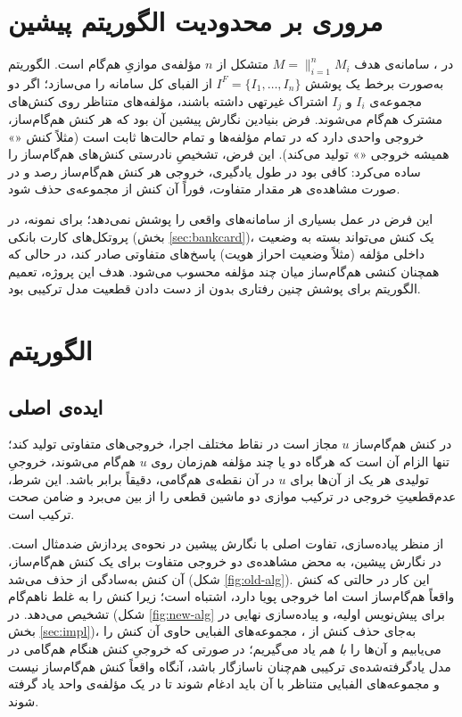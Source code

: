 \documentclass[a4paper,12pt]{article}
\numberwithin{algorithm}{section}
\begin{document}
\section{مروری بر محدودیت الگوریتم پیشین}
در ، سامانه‌ی هدف $M=\parallel_{i=1}^{n}M_i$ متشکل از $n$ مؤلفه‌ی موازیِ هم‌گام است. الگوریتم به‌صورت برخط یک پوشش $I^F=\{I_1,\dots,I_n\}$ از الفبای کل سامانه را می‌سازد؛ اگر دو مجموعه‌ی $I_i$ و $I_j$ اشتراک غیرتهی داشته باشند، مؤلفه‌های متناظر روی کنش‌های مشترک هم‌گام می‌شوند. فرض بنیادین نگارش پیشین آن بود که هر کنش هم‌گام‌ساز، خروجی واحدی دارد که در تمام مؤلفه‌ها و تمام حالت‌ها ثابت است (مثلاً کنش «» همیشه خروجی «» تولید می‌کند). این فرض، تشخیصِ نادرستی کنش‌های هم‌گام‌ساز را ساده می‌کرد: کافی بود در طول یادگیری، خروجی هر کنش هم‌گام‌ساز رصد و در صورت مشاهده‌ی هر مقدار متفاوت، فوراً آن کنش از مجموعه‌ی  حذف شود.

این فرض در عمل بسیاری از سامانه‌های واقعی را پوشش نمی‌دهد؛ برای نمونه، در پروتکل‌های کارت بانکی (بخش \ref{sec:bankcard})، یک کنش می‌تواند بسته به وضعیت داخلی مؤلفه (مثلاً وضعیت احراز هویت) پاسخ‌های متفاوتی صادر کند، در حالی که همچنان کنشی هم‌گام‌ساز میان چند مؤلفه محسوب می‌شود. هدف این پروژه، تعمیم الگوریتم برای پوشش چنین رفتاری بدون از دست دادن قطعیت مدل ترکیبی بود.

\section{الگوریتم }\label{sec:escl}

\subsection{ایده‌ی اصلی}
در  کنش هم‌گام‌ساز $u$ مجاز است در نقاط مختلف اجرا، خروجی‌های متفاوتی تولید کند؛ تنها الزام آن است که هرگاه دو یا چند مؤلفه هم‌زمان روی $u$ هم‌گام می‌شوند، خروجیِ تولیدی هر یک از آن‌ها برای $u$ در آن نقطه‌ی هم‌گامی، دقیقاً برابر باشد. این شرط، عدم‌قطعیتِ خروجی در ترکیب موازی دو ماشین  قطعی را از بین می‌برد و ضامن صحت ترکیب است.

از منظر پیاده‌سازی، تفاوت اصلی با نگارش پیشین در نحوه‌ی پردازش ضدمثال است. در نگارش پیشین، به محض مشاهده‌ی دو خروجی متفاوت برای یک کنش هم‌گام‌ساز، آن کنش به‌سادگی از  حذف می‌شد (شکل \ref{fig:old-alg}). این کار در حالتی که کنش واقعاً هم‌گام‌ساز است اما خروجی پویا دارد، اشتباه است؛ زیرا کنش را به غلط ناهم‌گام تشخیص می‌دهد. در  (شکل \ref{fig:new-alg} برای پیش‌نویس اولیه، و پیاده‌سازی نهایی در بخش \ref{sec:impl})، به‌جای حذف کنش از ، مجموعه‌های الفبایی حاوی آن کنش را می‌یابیم و آن‌ها را \emph{با هم} یاد می‌گیریم؛ در صورتی که خروجیِ کنش هنگام هم‌گامی در مدل یادگرفته‌شده‌ی ترکیبی هم‌چنان ناسازگار باشد، آنگاه واقعاً کنش هم‌گام‌ساز نیست و مجموعه‌های الفبایی متناظر با آن باید ادغام شوند تا در یک مؤلفه‌ی واحد یاد گرفته شوند.
\end{document}
